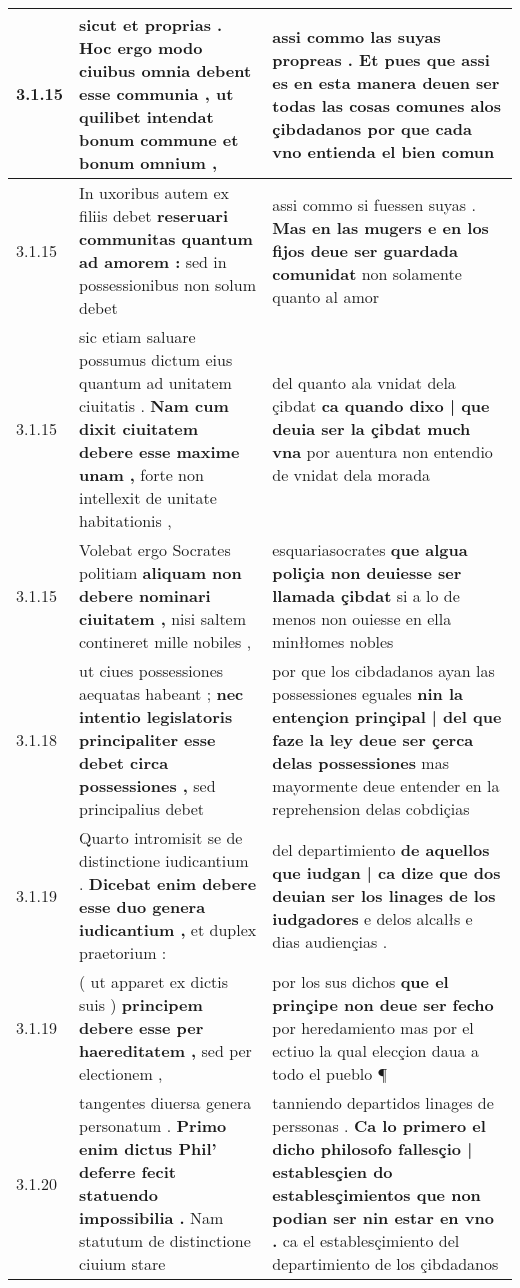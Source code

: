 \begin{tabular}{|p{1cm}|p{6.5cm}|p{6.5cm}|}
3.1.15 & sicut et proprias . \textbf{ Hoc ergo modo ciuibus omnia debent esse communia , } ut quilibet intendat bonum commune et bonum omnium , & assi commo las suyas propreas . \textbf{ Et pues que assi es en esta manera deuen ser todas las cosas comunes alos çibdadanos } por que cada vno entienda el bien comun \\\hline
3.1.15 & In uxoribus autem ex filiis debet \textbf{ reseruari communitas quantum ad amorem : } sed in possessionibus non solum debet & assi commo si fuessen suyas . \textbf{ Mas en las mugers e en los fijos deue ser guardada comunidat } non solamente quanto al amor \\\hline
3.1.15 & sic etiam saluare possumus dictum eius quantum ad unitatem ciuitatis . \textbf{ Nam cum dixit ciuitatem debere esse maxime unam , } forte non intellexit de unitate habitationis , & del quanto ala vnidat dela çibdat \textbf{ ca quando dixo | que deuia ser la çibdat much vna } por auentura non entendio de vnidat dela morada \\\hline
3.1.15 & Volebat ergo Socrates politiam \textbf{ aliquam non debere nominari ciuitatem , } nisi saltem contineret mille nobiles , & esquariasocrates \textbf{ que algua poliçia non deuiesse ser llamada çibdat } si a lo de menos non ouiesse en ella minłłomes nobles \\\hline
3.1.18 & ut ciues possessiones aequatas habeant ; \textbf{ nec intentio legislatoris principaliter esse debet circa possessiones , } sed principalius debet & por que los cibdadanos ayan las possessiones eguales \textbf{ nin la entençion prinçipal | del que faze la ley deue ser çerca delas possessiones } mas mayormente deue entender en la reprehension delas cobdiçias \\\hline
3.1.19 & Quarto intromisit se de distinctione iudicantium . \textbf{ Dicebat enim debere esse duo genera iudicantium , } et duplex praetorium : & del departimiento \textbf{ de aquellos que iudgan | ca dize que dos deuian ser los linages de los iudgadores } e delos alcalłs e dias audiençias . \\\hline
3.1.19 & ( ut apparet ex dictis suis ) \textbf{ principem debere esse per haereditatem , } sed per electionem , & por los sus dichos \textbf{ que el prinçipe non deue ser fecho } por heredamiento mas por el ectiuo la qual elecçion daua a todo el pueblo ¶ \\\hline
3.1.20 & tangentes diuersa genera personatum . \textbf{ Primo enim dictus Phil’ deferre fecit statuendo impossibilia . } Nam statutum de distinctione ciuium stare & tanniendo departidos linages de perssonas . \textbf{ Ca lo primero el dicho philosofo fallesçio | establesçien do establesçimientos que non podian ser nin estar en vno . } ca el establesçimiento del departimiento de los çibdadanos \\\hline

\end{tabular}
